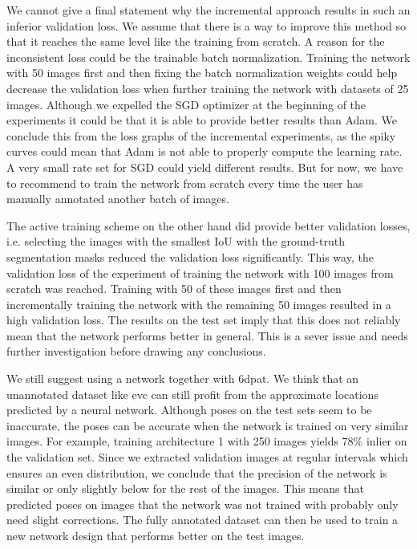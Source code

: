 We cannot give a final statement why the incremental approach results in such an inferior validation loss. We assume that there is a way to improve this method so that it reaches the same level like the training from scratch. A reason for the inconsistent loss could be the trainable batch normalization. Training the network with 50 images first and then fixing the batch normalization weights could help decrease the validation loss when further training the network with datasets of 25 images. Although we expelled the SGD optimizer at the beginning of the experiments it could be that it is able to provide better results than Adam. We conclude this from the loss graphs of the incremental experiments, as the spiky curves could mean that Adam is not able to properly compute the learning rate. A very small rate set for SGD could yield different results. But for now, we have to recommend to train the network from scratch every time the user has manually annotated another batch of images.

The active training scheme on the other hand did provide better validation losses, i.e. selecting the images with the smallest IoU with the ground-truth segmentation masks reduced the validation loss significantly. This way, the validation loss of the experiment of training the network with 100 images from scratch was reached. Training with 50 of these images first and then incrementally training the network with the remaining 50 images resulted in a high validation loss. The results on the test set imply that this does not reliably mean that the network performs better in general. This is a sever issue and needs further investigation before drawing any conclusions.

We still suggest using a network together with \ac{6dpat}. We think that an unannotated dataset like \ac{evc} can still profit from the approximate locations predicted by a neural network. Although poses on the test sets seem to be inaccurate, the poses can be accurate when the network is trained on very similar images. For example, training architecture 1 with 250 images yields 78\% inlier on the validation set. Since we extracted validation images at regular intervals which ensures an even distribution, we conclude that the precision of the network is similar or only slightly below for the rest of the images. This means that predicted poses on images that the network was not trained with probably only need slight corrections. The fully annotated dataset can then be used to train a new network design that performs better on the test images.